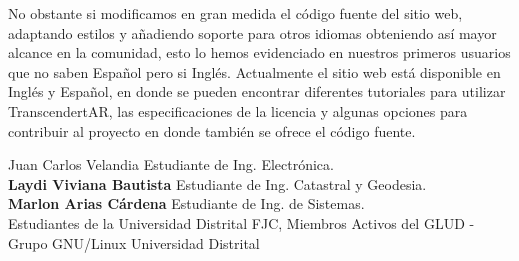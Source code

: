 \begin{multicols}{2}
No obstante si modificamos en gran medida el código fuente del sitio web, adaptando estilos y añadiendo soporte para otros idiomas obteniendo así mayor alcance en la comunidad, esto lo hemos evidenciado en nuestros primeros usuarios que no saben Español pero si Inglés. Actualmente el sitio web está disponible en Inglés y Español, en donde se pueden encontrar diferentes tutoriales para utilizar TranscendertAR, las especificaciones de la licencia y algunas opciones para contribuir al proyecto en donde también se ofrece el código fuente.







\begin{biografia}{}{Juan Carlos Velandia} 
Estudiante de Ing. Electrónica.\\
\textbf {Laydi Viviana Bautista} Estudiante de Ing. Catastral y Geodesia.\\
\textbf {Marlon Arias Cárdena} Estudiante de Ing. de Sistemas.\\

Estudiantes de la Universidad Distrital FJC, Miembros Activos del GLUD - Grupo GNU/Linux Universidad Distrital
\end{biografia}




\raggedcolumns
\pagebreak


\end{multicols}

